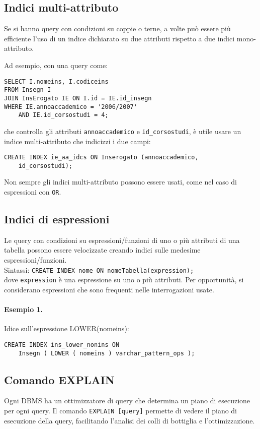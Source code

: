 \documentclass[a4paper, 10pt, titlepage]{article}
\begin{document}
	 \subsection{Indici multi-attributo}
	 Se si hanno query con condizioni su coppie o terne, a volte può essere più efficiente l'uso di un indice dichiarato su due attributi rispetto a due indici mono-attributo.
	 
	 Ad esempio, con una query come:
	 \begin{lstlisting}
SELECT I.nomeins, I.codiceins
FROM Insegn I
JOIN InsErogato IE ON I.id = IE.id_insegn
WHERE IE.annoaccademico = '2006/2007'
	AND IE.id_corsostudi = 4;
	 \end{lstlisting}
	 che controlla gli attributi \verb|annoaccademico| e \verb|id_corsostudi|, è utile usare un indice multi-attributo che indicizzi i due campi:
	 \begin{lstlisting}
CREATE INDEX ie_aa_idcs ON Inserogato (annoaccademico,
	id_corsostudi);
	 \end{lstlisting}
	 Non sempre gli indici multi-attributo possono essere usati, come nel caso di espressioni con \lstinline|OR|.
	 
	 \subsection{Indici di espressioni}
	 Le query con condizioni su espressioni/funzioni di uno o più attributi di una tabella possono essere velocizzate creando indici sulle medesime espressioni/funzioni.\\
Sintassi: \lstinline|CREATE INDEX nome ON nomeTabella(expression);|\\
dove \lstinline|expression| è una espressione su uno o più attributi.
Per opportunità, si considerano espressioni che sono frequenti nelle interrogazioni usate.
\paragraph{Esempio 1.}Idice sull'espressione LOWER(nomeins):
\begin{lstlisting}
CREATE INDEX ins_lower_nonins ON
	Insegn ( LOWER ( nomeins ) varchar_pattern_ops );
\end{lstlisting}
\newpage

 	\subsection{Comando EXPLAIN}
	Ogni DBMS ha un ottimizzatore di query che determina un piano di esecuzione per ogni query. Il comando \lstinline|EXPLAIN [query]| permette di vedere il piano di esecuzione della query, facilitando l'analisi dei colli di bottiglia e l'ottimizzazione.
	
\end{document}
